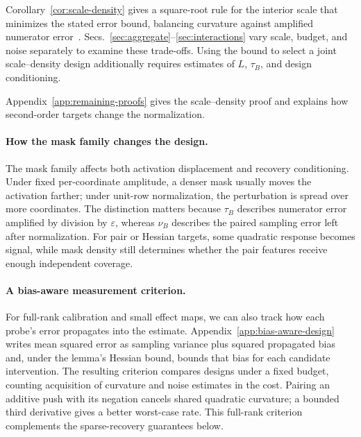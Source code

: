 \documentclass[sigconf,10pt,nonacm,balance=false]{acmart}
\newcommand{\eps}{\varepsilon}
\begin{document}
Corollary~\ref{cor:scale-density} gives a square-root rule for the interior scale that minimizes the stated error bound, balancing curvature against amplified numerator error~\cite{shi2022finite}. Secs.~\ref{sec:aggregate}--\ref{sec:interactions} vary scale, budget, and noise separately to examine these trade-offs. Using the bound to select a joint scale--density design additionally requires estimates of $L$, $\tau_B$, and design conditioning.

Appendix~\ref{app:remaining-proofs} gives the scale--density proof and explains how second-order targets change the normalization.

\paragraph{How the mask family changes the design.}
The mask family affects both activation displacement and recovery conditioning. Under fixed per-coordinate amplitude, a denser mask usually moves the activation farther; under unit-row normalization, the perturbation is spread over more coordinates. The distinction matters because $\tau_B$ describes numerator error amplified by division by $\eps$, whereas $\nu_B$ describes the paired sampling error left after normalization. For pair or Hessian targets, some quadratic response becomes signal, while mask density still determines whether the pair features receive enough independent coverage.

\paragraph{A bias-aware measurement criterion.}
For full-rank calibration and small effect maps, we can also track how each probe's error propagates into the estimate. Appendix~\ref{app:bias-aware-design} writes mean squared error as sampling variance plus squared propagated bias and, under the lemma's Hessian bound, bounds that bias for each candidate intervention. The resulting criterion compares designs under a fixed budget, counting acquisition of curvature and noise estimates in the cost. Pairing an additive push with its negation cancels shared quadratic curvature; a bounded third derivative gives a better worst-case rate. This full-rank criterion complements the sparse-recovery guarantees below.
\end{document}
